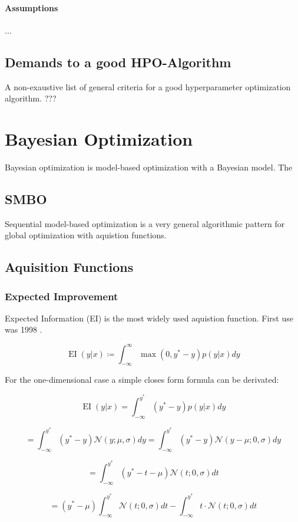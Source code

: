 \documentclass[english]{article}
\newcommand{\EI}{\operatorname{EI}}
\newcommand{\normal}{\mathcal{N}}
\begin{document}
\paragraph{Assumptions}
...

\subsection{Demands to a good HPO-Algorithm}
A non-exaustive list of general criteria for a good hyperparameter optimization algorithm. ???



\section{Bayesian Optimization}
Bayesian optimization is model-based optimization with a Bayesian model. The

\subsection{SMBO}
Sequential model-based optimization is a very general algorithmic pattern for global optimization with aquistion functions.

\subsection{Aquisition Functions}

\subsubsection{Expected Improvement}

Expected Information (EI) is the most widely used aquistion function. First use was 1998 \cite{jones_efficient_1998}.

$$ \EI(y|x) \coloneqq \int_{-\infty}^{\infty} \max(0, y^*-y)p(y|x)dy $$

For the one-dimensional case a simple closes form formula can be derivated:

$$ \EI(y|x) = \int_{-\infty}^{y^*}(y^*-y)p(y|x)dy$$

$$ = \int_{-\infty}^{y^*}(y^*-y)\normal(y; \mu, \sigma)dy =
\int_{-\infty}^{y^*}(y^*-y)\normal(y-\mu; 0, \sigma)dy$$

$$ = \int_{-\infty}^{y^*}(y^*- t - \mu)\normal(t; 0, \sigma)dt $$

$$ = (y^*-\mu)\int_{-\infty}^{y^*}\normal(t; 0, \sigma)dt - \int_{-\infty}^{y^*}t\cdot\normal(t; 0, \sigma)dt$$
\end{document}

